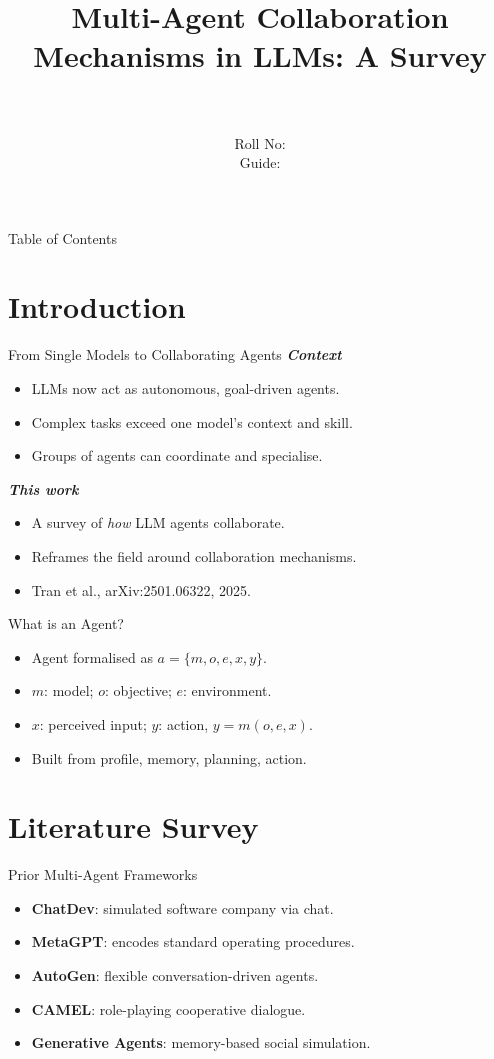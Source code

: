 \documentclass{beamer}
\title[\seminarShortTitle]{Multi-Agent Collaboration Mechanisms in LLMs: A Survey}
\author[\seminarName\ (\seminarShortCollege)]{\seminarName \\ \seminarRoll \\ Roll No: \seminarClassRoll \\ Guide: \seminarGuide}
\institute[\seminarShortCollege]{\seminarDept \\ \seminarCollege}
\date{\seminarDate}
\begin{document}
\begin{frame}\titlepage\end{frame}
\begin{frame}{Table of Contents}\tableofcontents\end{frame}
\section{Introduction}
\begin{frame}{From Single Models to Collaborating Agents}
\textbf{\textit{Context}}
\begin{itemize}
  \item LLMs now act as autonomous, goal-driven agents.
  \item Complex tasks exceed one model's context and skill.
  \item Groups of agents can coordinate and specialise.
\end{itemize}
\textbf{\textit{This work}}
\begin{itemize}
  \item A survey of \emph{how} LLM agents collaborate.
  \item Reframes the field around collaboration mechanisms.
  \item Tran et al., arXiv:2501.06322, 2025.
\end{itemize}
\end{frame}

\begin{frame}{What is an Agent?}
\begin{itemize}
  \item Agent formalised as $a=\{m,o,e,x,y\}$.
  \item $m$: model; $o$: objective; $e$: environment.
  \item $x$: perceived input; $y$: action, $y=m(o,e,x)$.
  \item Built from profile, memory, planning, action.
\end{itemize}
\end{frame}

\section{Literature Survey}
\begin{frame}{Prior Multi-Agent Frameworks}
\begin{itemize}
  \item \textbf{ChatDev}: simulated software company via chat.
  \item \textbf{MetaGPT}: encodes standard operating procedures.
  \item \textbf{AutoGen}: flexible conversation-driven agents.
  \item \textbf{CAMEL}: role-playing cooperative dialogue.
  \item \textbf{Generative Agents}: memory-based social simulation.
\end{itemize}
\end{frame}
\end{document}
